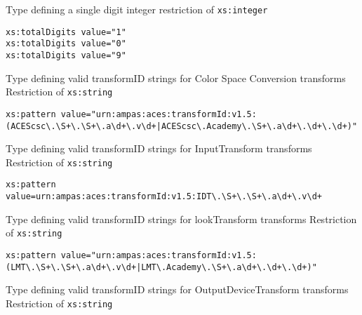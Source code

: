             {Type defining a single digit integer}
            {restriction of \texttt{xs:integer}}
                
            \begin{adjustwidth}{5mm}{}            
            \lstinline{xs:totalDigits value="1"} \\
            \lstinline{xs:totalDigits value="0"} \\
            \lstinline{xs:totalDigits value="9"}
        \end{adjustwidth}
        
            {Type defining valid transformID strings for Color Space Conversion transforms}
            {Restriction of \texttt{xs:string}}
            
            \begin{adjustwidth}{5mm}{}            
                \lstinline{xs:pattern value="urn:ampas:aces:transformId:v1.5:(ACEScsc\.\S+\.\S+\.a\d+\.v\d+|ACEScsc\.Academy\.\S+\.a\d+\.\d+\.\d+)"}
            \end{adjustwidth}

            {Type defining valid transformID strings for InputTransform transforms}
            {Restriction of \texttt{xs:string}}

            \begin{adjustwidth}{5mm}{}            
            \lstinline{xs:pattern value=urn:ampas:aces:transformId:v1.5:IDT\.\S+\.\S+\.a\d+\.v\d+}
            \end{adjustwidth}

            {Type defining valid transformID strings for lookTransform transforms}
            {Restriction of \texttt{xs:string}}

            \begin{adjustwidth}{5mm}{}            
            \lstinline{xs:pattern value="urn:ampas:aces:transformId:v1.5:(LMT\.\S+\.\S+\.a\d+\.v\d+|LMT\.Academy\.\S+\.a\d+\.\d+\.\d+)"}
            \end{adjustwidth}

            {Type defining valid transformID strings for OutputDeviceTransform transforms}
            {Restriction of \texttt{xs:string}}
            
